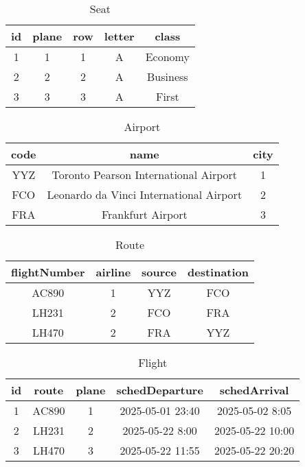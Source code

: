 \begin{table}[h!]
\centering         
\begin{tabular}{|c|c|c|c|c|} 
\hline             
id & plane & row & letter & class \\ 
\hline
1 & 1 & 1 & A & Economy\\ 
\hline
2 & 2 & 2 & A & Business\\
\hline
3 & 3 & 3 & A & First\\ 
\hline
\end{tabular}
\caption{Seat} 
\label{tab:example} 
\end{table}

\begin{table}[h!]
\centering         
\begin{tabular}{|c|c|c|} 
\hline             
code & name & city \\ 
\hline
YYZ & Toronto Pearson International Airport & 1 \\ 
\hline
FCO & Leonardo da Vinci International Airport & 2 \\
\hline
FRA & Frankfurt Airport & 3 \\ 
\hline
\end{tabular}
\caption{Airport} 
\label{tab:example} 
\end{table}

\begin{table}[h!]
\centering         
\begin{tabular}{|c|c|c|c|} 
\hline             
flightNumber & airline & source & destination \\ 
\hline
AC890 & 1 & YYZ & FCO\\ 
\hline
LH231 & 2 & FCO & FRA\\
\hline
LH470 & 2 & FRA & YYZ\\ 
\hline
\end{tabular}
\caption{Route} 
\label{tab:example} 
\end{table}

\newpage

\begin{table}[h!]
\centering         
\begin{tabular}{|c|c|c|c|c|} 
\hline             
id & route & plane & schedDeparture & schedArrival \\ 
\hline
1 & AC890 & 1 & 2025-05-01 23:40 & 2025-05-02 8:05\\ 
\hline
2 & LH231 & 2 & 2025-05-22 8:00 & 2025-05-22 10:00\\
\hline
3 & LH470 & 3 & 2025-05-22 11:55 & 2025-05-22 20:20\\ 
\hline
\end{tabular}
\caption{Flight} 
\label{tab:example} 
\end{table}

